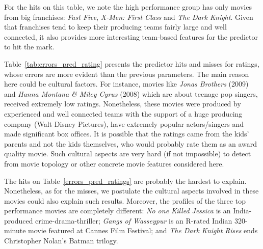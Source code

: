 For the hits on this table, we note the high performance group has only movies
from big franchises: \textit{Fast Five}, \textit{X-Men: First Class} and
\textit{The Dark Knight}. Given that franchises tend to keep their producing
teams fairly large and well connected, it also provides more interesting
team-based features for the predictor to hit the mark.

Table~\ref{tab:errors_pred_rating} presents the predictor hits and misses for
ratings, whose errors are more evident than the previous parameters. The main
reason here could be cultural factors. For instance, movies like \textit{Jonas
Brothers} (2009) and \textit{Hanna Montana \& Miley Cyrus} (2008) which are
about teenage pop singers, received extremely low ratings. Nonetheless, these
movies were produced by experienced and well connected teams with the support
of a huge producing company (Walt Disney Pictures), have extremely popular
actors/singers and made significant box offices. It is possible that the
ratings came from the kids' parents and not the kids themselves, who would
probably rate them as an award quality movie. Such cultural aspects are very
hard (if not impossible) to detect from movie topology or other concrete movie
features considered here.

The hits on Table~\ref{errors_pred_ratings} are probably the hardest to
explain. Nonetheless, as for the misses, we postulate the cultural aspects
involved in these movies could also explain such results. Moreover, the
profiles of the three top performance movies are completely different:
\textit{No one Killed Jessica} is an India-produced crime-drama-thriller;
\textit{Gangs of Wasseypur} is an R-rated Indian 320-minute movie featured at
Cannes Film Festival; and \textit{The Dark Knight Rises} ends Christopher
Nolan's Batman trilogy.
